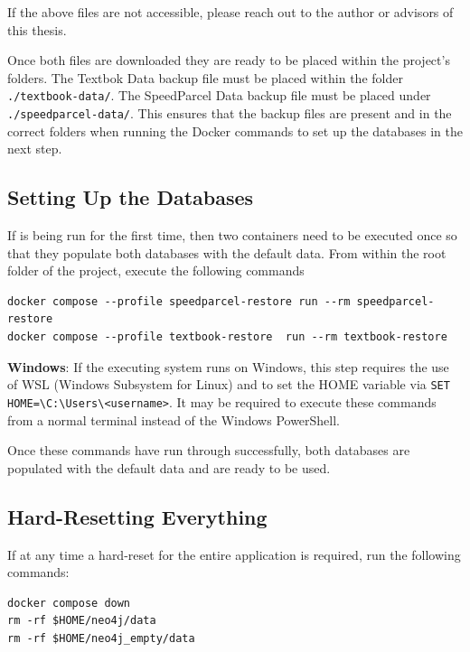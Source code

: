 If the above files are not accessible, please reach out to the author or advisors of this thesis.

Once both files are downloaded they are ready to be placed within the project's folders. The Textbok Data backup file must be placed within the folder \texttt{./textbook-data/}. The SpeedParcel Data backup file must be placed under \texttt{./speedparcel-data/}. This ensures that the backup files are present and in the correct folders when running the Docker commands to set up the databases in the next step.

\subsection{Setting Up the Databases}
\label{appendix:database_setup}
If \prototype{} is being run for the first time, then two containers need to be executed once so that they populate both databases with the default data. From within the root folder of the project, execute the following commands

\begin{lstlisting}[style=dockerstyle, label={lst:first_time_setup}]
docker compose --profile speedparcel-restore run --rm speedparcel-restore
docker compose --profile textbook-restore  run --rm textbook-restore
\end{lstlisting}

\textbf{Windows}: If the executing system runs on Windows, this step requires the use of WSL (Windows Subsystem for Linux) and to set the HOME variable via \texttt{SET HOME=\textbackslash{}C:\textbackslash{}Users\textbackslash{}<username>}. It may be required to execute these commands from a normal terminal instead of the Windows PowerShell.

Once these commands have run through successfully, both databases are populated with the default data and are ready to be used.

\subsection{Hard-Resetting Everything}
\label{appendix:instructions:hardreset}
If at any time a hard-reset for the entire application is required, run the following commands:
\begin{lstlisting}[style=dockerstyle, label={lst:reset_docker}]
docker compose down
rm -rf $HOME/neo4j/data
rm -rf $HOME/neo4j_empty/data
\end{lstlisting}

